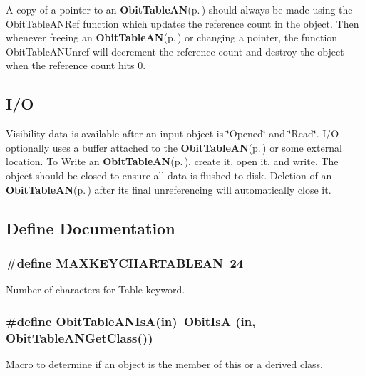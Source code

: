 A copy of a pointer to an {\bf Obit\-Table\-AN}{\rm (p.\,\pageref{structObitTableAN})} should always be made using the Obit\-Table\-ANRef function which updates the reference count in the object. Then whenever freeing an {\bf Obit\-Table\-AN}{\rm (p.\,\pageref{structObitTableAN})} or changing a pointer, the function Obit\-Table\-ANUnref will decrement the reference count and destroy the object when the reference count hits 0.\subsection{I/O}\label{ObitTableAN_8h_ObitTableANUsage}
Visibility data is available after an input object is \char`\"{}Opened\char`\"{} and \char`\"{}Read\char`\"{}. I/O optionally uses a buffer attached to the {\bf Obit\-Table\-AN}{\rm (p.\,\pageref{structObitTableAN})} or some external location. To Write an {\bf Obit\-Table\-AN}{\rm (p.\,\pageref{structObitTableAN})}, create it, open it, and write. The object should be closed to ensure all data is flushed to disk. Deletion of an {\bf Obit\-Table\-AN}{\rm (p.\,\pageref{structObitTableAN})} after its final unreferencing will automatically close it.

\subsection{Define Documentation}
\subsubsection{\setlength{\rightskip}{0pt plus 5cm}\#define MAXKEYCHARTABLEAN\ 24}\label{ObitTableAN_8h_a0}


Number of characters for Table keyword. 

\subsubsection{\setlength{\rightskip}{0pt plus 5cm}\#define Obit\-Table\-ANIs\-A(in)\ Obit\-Is\-A (in, Obit\-Table\-ANGet\-Class())}\label{ObitTableAN_8h_a3}


Macro to determine if an object is the member of this or a derived class. 

